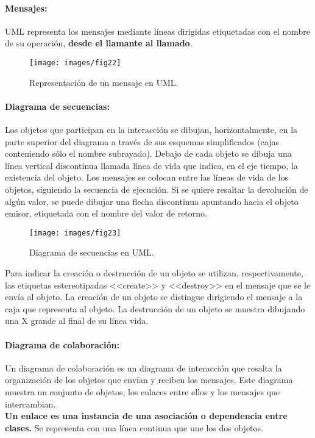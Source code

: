 \vspace{5mm}

\paragraph{Mensajes:}
UML representa los mensajes mediante líneas dirigidas etiquetadas con
el nombre de su operación, \textbf{desde el llamante al llamado}.

\begin{figure}[ht!]  \centering
  \texttt{[image: images/fig22]}
  \caption{Representación de un mensaje en UML.}
  \label{fig:22}
\end{figure}

\paragraph{Diagrama de secuencias:}
Los objetos que participan en la interacción se dibujan,
horizontalmente, en la parte superior del diagrama a través de sus
esquemas simplificados (cajas conteniendo sólo el nombre
subrayado). Debajo de cada objeto se dibuja una línea vertical
discontinua llamada línea de vida que indica, en el eje tiempo, la
existencia del objeto.
Los mensajes se colocan entre las líneas de vida de los objetos,
siguiendo la secuencia de ejecución. Si se quiere resaltar la
devolución de algún valor, se puede dibujar una flecha discontinua
apuntando hacia el objeto emisor, etiquetada con el nombre del valor
de retorno.

\begin{figure}[ht!]  \centering
  \texttt{[image: images/fig23]}
  \caption{Diagrama de secuencias en UML.}
  \label{fig:23}
\end{figure}

Para indicar la creación o destrucción de un objeto se utilizan,
respectivamente, las etiquetas estereotipadas \textrm{<<create>>} y
\textrm{<<destroy>>} en el mensaje que se le envía al objeto. La
creación de un objeto se distingue dirigiendo el mensaje a la caja que
representa al objeto. La destrucción de un objeto se muestra dibujando
una X grande al final de su línea vida.

\paragraph{Diagrama de colaboración:}
Un diagrama de colaboración es un diagrama de interacción que resalta
la organización de los objetos que envían y reciben los mensajes. Este
diagrama muestra un conjunto de objetos, los enlaces entre ellos y los
mensajes que intercambian.\\
\textbf{Un enlace es una instancia de una asociación o dependencia entre
  clases.} Se representa con una línea continua que une los dos
objetos.


